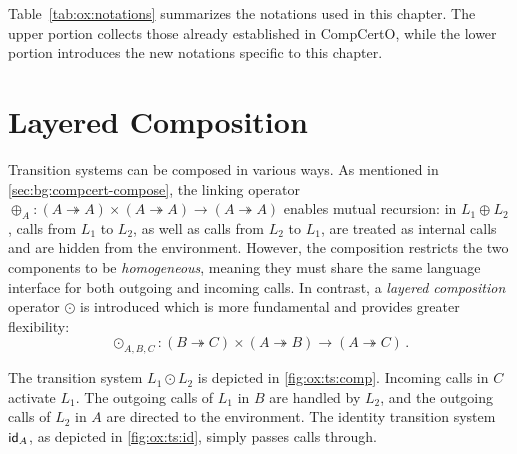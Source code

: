 Table~\ref{tab:ox:notations} summarizes the notations used in this chapter.
The upper portion collects those already established in CompCertO,
while the lower portion introduces the new notations specific to this chapter.

\section{Layered Composition}
\label{sec:ox:layered}

Transition systems can be composed
in various ways.
As mentioned in \autoref{sec:bg:compcert-compose},
the linking operator
$\oplus_A : (A \twoheadrightarrow A) \times (A \twoheadrightarrow A)
\rightarrow (A \twoheadrightarrow A)$
enables mutual recursion:
in $L_1 \oplus L_2$,
calls from $L_1$ to $L_2$,
as well as calls from $L_2$ to $L_1$,
are treated as internal calls
and are hidden from the environment.
However,
the composition restricts the two components
to be \emph{homogeneous},
meaning they must share the same language interface
for both outgoing and incoming calls.
In contrast,
a \emph{layered composition} operator $\odot$ is introduced
which is more fundamental and
provides greater flexibility:
\[
  {\odot}_{A,B,C} :
  (B \twoheadrightarrow C) \times
  (A \twoheadrightarrow B) \rightarrow
  (A \twoheadrightarrow C)
  \,.
\]

The transition system
$L_1 \odot L_2$
is depicted in \autoref{fig:ox:ts:comp}.
Incoming calls in $C$ activate $L_1$.
The outgoing calls of $L_1$ in $B$
are handled by $L_2$,
and the outgoing calls of $L_2$
in $A$ are directed to the environment.
The identity transition system $ \mathsf{id} _A$,
as depicted in \autoref{fig:ox:ts:id},
simply passes calls through.

